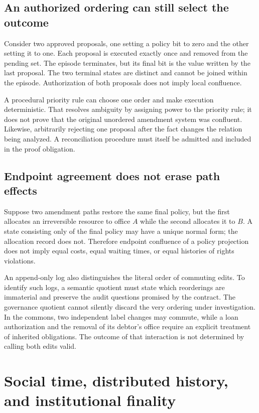\subsection{An authorized ordering can still select the outcome}
Consider two approved proposals, one setting a policy bit to zero and the other setting it to one. Each proposal is executed exactly once and removed from the pending set. The episode terminates, but its final bit is the value written by the last proposal. The two terminal states are distinct and cannot be joined within the episode. Authorization of both proposals does not imply local confluence.

A procedural priority rule can choose one order and make execution deterministic. That resolves ambiguity by assigning power to the priority rule; it does not prove that the original unordered amendment system was confluent. Likewise, arbitrarily rejecting one proposal after the fact changes the relation being analyzed. A reconciliation procedure must itself be admitted and included in the proof obligation.

\subsection{Endpoint agreement does not erase path effects}
Suppose two amendment paths restore the same final policy, but the first allocates an irreversible resource to office $A$ while the second allocates it to $B$. A state consisting only of the final policy may have a unique normal form; the allocation record does not. Therefore endpoint confluence of a policy projection does not imply equal costs, equal waiting times, or equal histories of rights violations.

An append-only log also distinguishes the literal order of commuting edits. To identify such logs, a semantic quotient must state which reorderings are immaterial and preserve the audit questions promised by the contract. The governance quotient cannot silently discard the very ordering under investigation. In the commons, two independent label changes may commute, while a loan authorization and the removal of its debtor's office require an explicit treatment of inherited obligations. The outcome of that interaction is not determined by calling both edits valid.

\section{Social time, distributed history, and institutional finality}\label{MS:sec:social-time}

